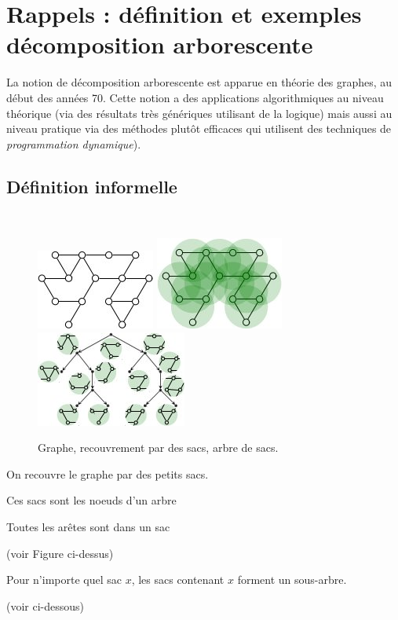 \documentclass[a4paper,12pt]{article}
\theoremstyle{definition}
\theoremstyle{remark}
\begin{document}
\section{Rappels : définition et exemples décomposition arborescente}




La notion de décomposition arborescente est apparue en théorie des
graphes, au début des années 70. Cette notion a des applications algorithmiques au
niveau théorique (via des résultats très génériques utilisant de la
logique) mais aussi au niveau pratique via des méthodes plutôt
efficaces qui utilisent des techniques de \emph{programmation
  dynamique}). 



\subsection*{Définition informelle}

\

\begin{figure}[h]
  \centering
  \begin{center}
    \includegraphics[width=.25\textwidth]{dessins/graphtw.jpg}
    \quad 
    \includegraphics[width=.25\textwidth]{dessins/graphtwbags.jpg}
    \quad 
    \includegraphics[width=.25\textwidth]{dessins/graphtwtreeofbags.jpg}
  \end{center}
  \caption{Graphe, recouvrement par des sacs, arbre de sacs.}
\end{figure}

\begin{framed}
  \begin{compactitem}
  \item 
    On recouvre le graphe par des petits sacs.
  \item 
    Ces sacs sont les noeuds d'un arbre
  \item 
    Toutes les arêtes sont dans un sac
  \end{compactitem}
  (voir Figure ci-dessus)
  \begin{compactitem}
  \item 
    Pour n'importe quel sac $x$,
    les sacs contenant $x$ forment un sous-arbre. 
  \end{compactitem}
  (voir ci-dessous)
\end{framed}
\end{document}
